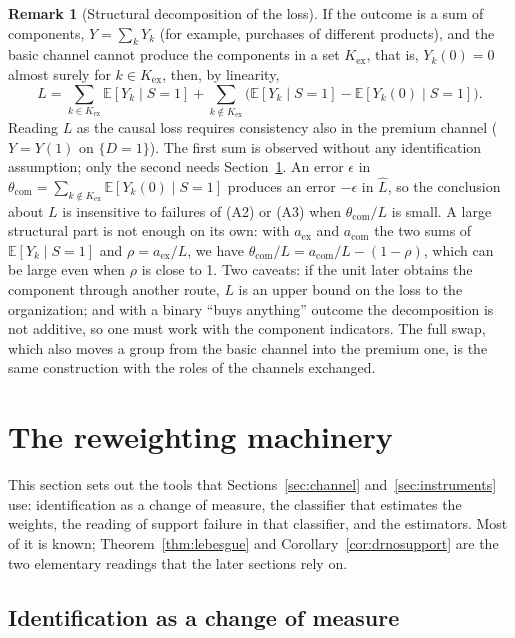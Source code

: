 \documentclass[11pt,a4paper]{article}
\newcommand{\E}{\mathbb{E}}
\theoremstyle{plain}
\theoremstyle{definition}
\newtheorem{remark}{Remark}
\begin{document}
\begin{remark}[Structural decomposition of the loss]\label{rem:decomposition}
If the outcome is a sum of components, $Y=\sum_kY_k$ (for example, purchases of different products), and the basic channel cannot produce the components in a set $K_{\mathrm{ex}}$, that is, $Y_k(0)=0$ almost surely for $k\in K_{\mathrm{ex}}$, then, by linearity,
\[
L=\sum_{k\in K_{\mathrm{ex}}}\E[Y_k\mid S=1]+\sum_{k\notin K_{\mathrm{ex}}}\bigl(\E[Y_k\mid S=1]-\E[Y_k(0)\mid S=1]\bigr).
\]
Reading $L$ as the causal loss requires consistency also in the premium channel ($Y=Y(1)$ on $\{D=1\}$). The first sum is observed without any identification assumption; only the second needs Section~\ref{sec:identification}. An error $\epsilon$ in $\theta_{\mathrm{com}}=\sum_{k\notin K_{\mathrm{ex}}}\E[Y_k(0)\mid S=1]$ produces an error $-\epsilon$ in $\hat L$, so the conclusion about $L$ is insensitive to failures of (A2) or (A3) when $\theta_{\mathrm{com}}/L$ is small. A large structural part is not enough on its own: with $a_{\mathrm{ex}}$ and $a_{\mathrm{com}}$ the two sums of $\E[Y_k\mid S=1]$ and $\rho=a_{\mathrm{ex}}/L$, we have $\theta_{\mathrm{com}}/L=a_{\mathrm{com}}/L-(1-\rho)$, which can be large even when $\rho$ is close to 1. Two caveats: if the unit later obtains the component through another route, $L$ is an upper bound on the loss to the organization; and with a binary ``buys anything'' outcome the decomposition is not additive, so one must work with the component indicators. The full swap, which also moves a group from the basic channel into the premium one, is the same construction with the roles of the channels exchanged.
\end{remark}
\section{The reweighting machinery}\label{sec:identification}

This section sets out the tools that Sections~\ref{sec:channel} and~\ref{sec:instruments} use: identification as a change of measure, the classifier that estimates the weights, the reading of support failure in that classifier, and the estimators. Most of it is known; Theorem~\ref{thm:lebesgue} and Corollary~\ref{cor:drnosupport} are the two elementary readings that the later sections rely on.

\subsection{Identification as a change of measure}
\end{document}
